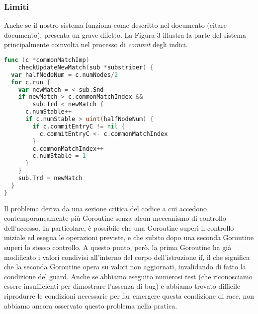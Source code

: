 \subsubsection{Limiti}
Anche se il nostro sistema funziona come descritto nel documento (citare documento), presenta un grave difetto. La Figura 3 illustra la parte del sistema principalmente coinvolta nel processo di \textit{commit} degli indici.
\\
\begin{lstlisting}[language=Go]
func (c *commonMatchImp) 
    checkUpdateNewMatch(sub *substriber) { 
  var halfNodeNum = c.numNodes/2 
  for c.run { 
    var newMatch = <-sub.Snd 
    if newMatch > c.commonMatchIndex && 
        sub.Trd < newMatch { 
      c.numStable++ 
      if c.numStable > uint(halfNodeNum) {
        if c.commitEntryC != nil {
          c.commitEntryC <- c.commonMatchIndex
        } 
        c.commonMatchIndex++
        c.numStable = 1
      } 
    } 
    sub.Trd = newMatch
  } 
}
\end{lstlisting}
Il problema deriva da una sezione critica del codice a cui accedono contemporaneamente più Goroutine senza alcun meccanismo di controllo dell'accesso. In particolare, è possibile che una Goroutine 
superi il controllo iniziale ed esegua le operazioni previste, e che subito dopo una seconda Goroutine superi lo stesso controllo. A questo punto, però, la prima Goroutine ha già modificato i valori condivisi all'interno del 
corpo dell'istruzione if, il che significa che la seconda Goroutine opera su valori non aggiornati, invalidando di fatto la condizione del guard. Anche se abbiamo eseguito numerosi test (che riconosciamo essere insufficienti 
per dimostrare l'assenza di bug) e abbiamo trovato difficile riprodurre le condizioni necessarie per far emergere questa condizione di race, non abbiamo ancora osservato questo problema nella pratica.
